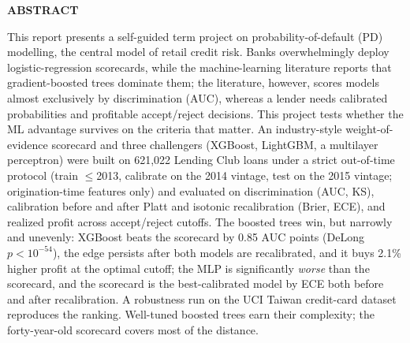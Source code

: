 \documentclass[a4paper,twocolumn,10pt]{article}
\begin{document}

\begin{center}\textbf{ABSTRACT}\end{center}
\noindent
This report presents a self-guided term project on probability-of-default (PD) modelling, the central model of retail credit risk. Banks overwhelmingly deploy logistic-regression scorecards, while the machine-learning literature reports that gradient-boosted trees dominate them; the literature, however, scores models almost exclusively by discrimination (AUC), whereas a lender needs calibrated probabilities and profitable accept/reject decisions. This project tests whether the ML advantage survives on the criteria that matter. An industry-style weight-of-evidence scorecard and three challengers (XGBoost, LightGBM, a multilayer perceptron) were built on 621{,}022 Lending Club loans under a strict out-of-time protocol (train $\le$2013, calibrate on the 2014 vintage, test on the 2015 vintage; origination-time features only) and evaluated on discrimination (AUC, KS), calibration before and after Platt and isotonic recalibration (Brier, ECE), and realized profit across accept/reject cutoffs. The boosted trees win, but narrowly and unevenly: XGBoost beats the scorecard by 0.85 AUC points (DeLong $p<10^{-54}$), the edge persists after both models are recalibrated, and it buys 2.1\% higher profit at the optimal cutoff; the MLP is significantly \emph{worse} than the scorecard, and the scorecard is the best-calibrated model by ECE both before and after recalibration. A robustness run on the UCI Taiwan credit-card dataset reproduces the ranking. Well-tuned boosted trees earn their complexity; the forty-year-old scorecard covers most of the distance.
\end{document}
